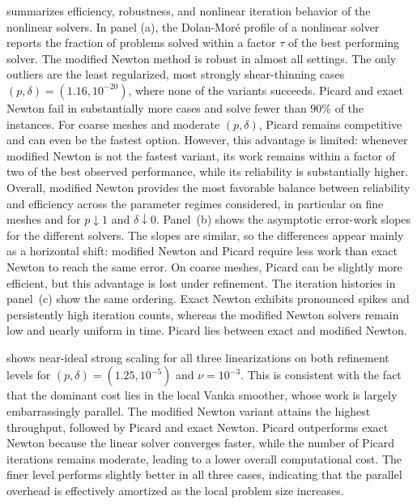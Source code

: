 \documentclass[DIV=16]{scrartcl}
\newcommand{\reg}{\delta}
\newcommand{\pn}{p}
\begin{document}
 summarizes efficiency, robustness, and nonlinear iteration
behavior of the nonlinear solvers. In panel (a), the Dolan-Mor\'e profile of a
nonlinear solver reports the fraction of problems solved within a factor $\tau$
of the best performing solver. The modified Newton method is robust in almost
all settings. The only outliers are the least regularized, most strongly
shear-thinning cases \((\pn,\reg)=(1.16,10^{-20})\), where none of the variants
succeeds. Picard and exact Newton fail in substantially more cases and solve
fewer than \(90\%\) of the instances. For coarse meshes and moderate
\((\pn,\reg)\), Picard remains competitive and can even be the fastest option.
However, this advantage is limited: whenever modified Newton is not the fastest
variant, its work remains within a factor of two of the best observed
performance, while its reliability is substantially higher. Overall, modified
Newton provides the most favorable balance between reliability and efficiency
across the parameter regimes considered, in particular on fine meshes and for
\(\pn\downarrow 1\) and \(\delta\downarrow 0\). Panel~(b) shows the asymptotic
error-work slopes for the different solvers. The slopes are similar, so the
differences appear mainly as a horizontal shift: modified Newton and Picard
require less work than exact Newton to reach the same error. On coarse meshes,
Picard can be slightly more efficient, but this advantage is lost under
refinement. The iteration histories in panel~(c) show the same ordering. Exact
Newton exhibits pronounced spikes and persistently high iteration counts,
whereas the modified Newton solvers remain low and nearly uniform in time.
Picard lies between exact and modified Newton.

 shows near-ideal strong scaling for all three
linearizations on both refinement levels for $(\pn,\reg)=(1.25,10^{-5})$ and
$\nu=10^{-3}$. This is consistent with the fact that the dominant cost lies in
the local Vanka smoother, whose work is largely embarrassingly parallel. The
modified Newton variant attains the highest throughput, followed by Picard and
exact Newton. Picard outperforms exact Newton because the linear solver
converges faster, while the number of Picard iterations remains moderate,
leading to a lower overall computational cost. The finer level performs slightly
better in all three cases, indicating that the parallel overhead is effectively
amortized as the local problem size increases.
\end{document}
